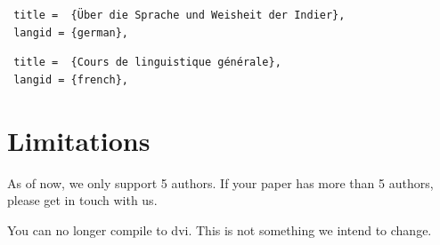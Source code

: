 \begin{verbatim}
 title =  {Über die Sprache und Weisheit der Indier},
 langid = {german},
\end{verbatim}

\begin{verbatim}
 title =  {Cours de linguistique générale},
 langid = {french},
\end{verbatim}

\section{Limitations}

As of now, we only support 5 authors. If your paper has more than 5 authors, please get in touch with us.

You can no longer compile to dvi. This is not something we intend to change.


\renewcommand{\Abbrevs}{List here the abbreviations you used in your paper. For a list of standard abbreviations, refer to the \href{https://www.eva.mpg.de/lingua/resources/glossing-rules.php}{Leipzig glossing rules}. Sort alphabetically, and indicate the abbreviations in the following format: \textsc{gen} = genitive, \textsc{m} = masculine, \textsc{sg} = singular.}%


